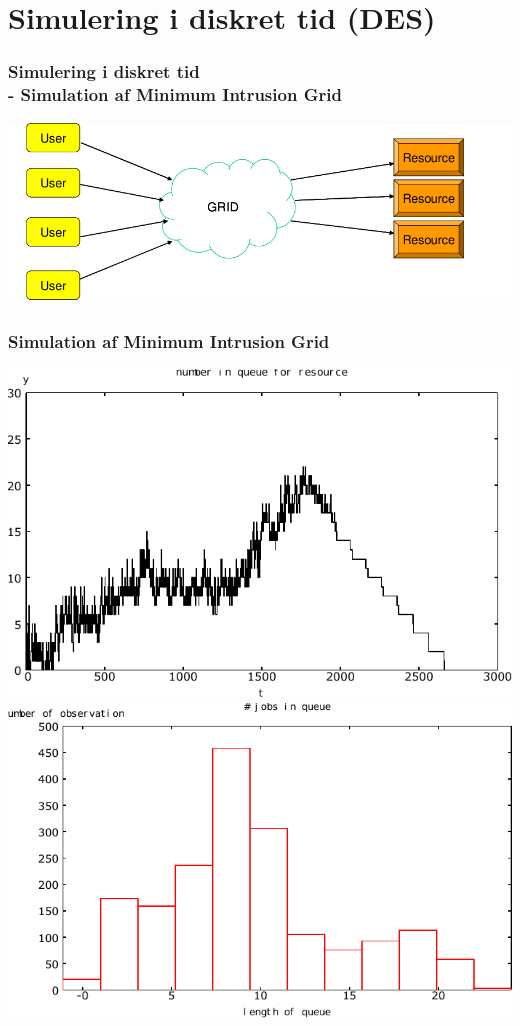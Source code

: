 \documentclass[12pt]{beamer}
\begin{document}
\section{Simulering i diskret tid (DES)}
\begin{frame}
  \frametitle{Simulering i diskret tid\\
-  Simulation af Minimum Intrusion Grid
}
  \includegraphics[scale=0.3]{mig}  
\end{frame}

\begin{frame}
  \frametitle{Simulation af Minimum Intrusion Grid
}
  \includegraphics[scale=0.45]{tidsmodel-1}
  \includegraphics[scale=0.45]{queue}
\end{frame}
\end{document}
